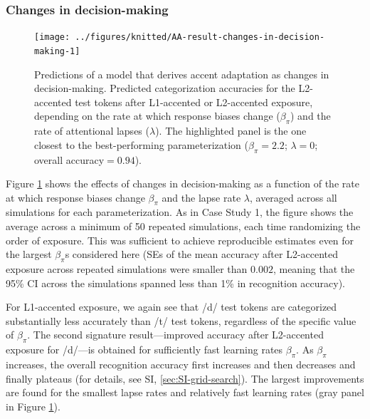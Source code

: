 \documentclass[
  11pt,
  man,floatsintext]{apa6}
\begin{document}
\subsubsection{Changes in decision-making}\label{changes-in-decision-making-1}



\begin{figure}

{\centering \texttt{[image: ../figures/knitted/AA-result-changes-in-decision-making-1]} 

}

\caption{Predictions of a model that derives accent adaptation as changes in decision-making. Predicted categorization accuracies for the L2-accented test tokens after L1-accented or L2-accented exposure, depending on the rate at which response biases change (\(\beta_{\pi}\)) and the rate of attentional lapses (\(\lambda\)). The highlighted panel is the one closest to the best-performing parameterization (\(\beta_{\pi} = 2.2\); \(\lambda=0\); overall accuracy\(=0.94\)).}\label{fig:AA-result-changes-in-decision-making}
\end{figure}

Figure \ref{fig:AA-result-changes-in-decision-making} shows the effects of changes in decision-making as a function of the rate at which response biases change \(\beta_{\pi}\) and the lapse rate \(\lambda\), averaged across all simulations for each parameterization. As in Case Study 1, the figure shows the average across a minimum of 50 repeated simulations, each time randomizing the order of exposure. This was sufficient to achieve reproducible estimates even for the largest \(\beta_{\pi}\)s considered here (SEs of the mean accuracy after L2-accented exposure across repeated simulations were smaller than \(0.002\), meaning that the 95\% CI across the simulations spanned less than 1\% in recognition accuracy).

For L1-accented exposure, we again see that /d/ test tokens are categorized substantially less accurately than /t/ test tokens, regardless of the specific value of \(\beta_{\pi}\). The second signature result---improved accuracy after L2-accented exposure for /d/---is obtained for sufficiently fast learning rates \(\beta_{\pi}\). As \(\beta_{\pi}\) increases, the overall recognition accuracy first increases and then decreases and finally plateaus (for details, see SI, \ref{sec:SI-grid-search}). The largest improvements are found for the smallest lapse rates and relatively fast learning rates (gray panel in Figure \ref{fig:AA-result-changes-in-decision-making}).
\end{document}
